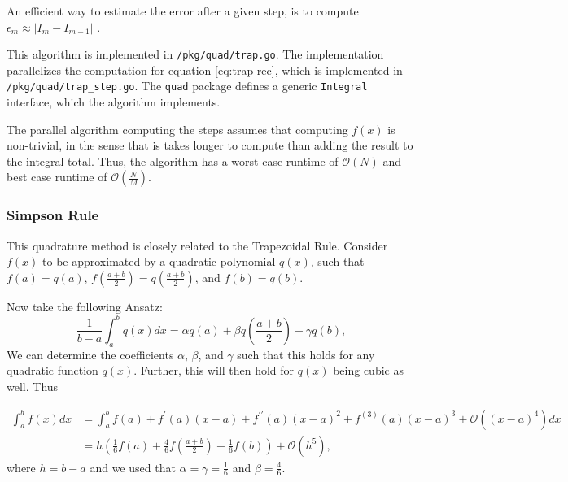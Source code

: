 \documentclass[10pt, a4paper]{article}
\begin{document}
  An efficient way to estimate the error after a given step, is to compute $\epsilon_m \approx |I_m - I_{m-1}|$
  \cite{nr}\footnotemark.


  This algorithm is implemented in \texttt{/pkg/quad/trap.go}. The implementation parallelizes the computation
  for equation \ref{eq:trap-rec}, which is implemented in \texttt{/pkg/quad/trap\_step.go}.
  The \texttt{quad} package defines a generic \texttt{Integral} interface, which the algorithm implements.

  The parallel algorithm computing the steps assumes that computing $f(x)$ is non-trivial, in the sense
  that is takes longer to compute than adding the result to the integral total. Thus, the
  algorithm has a worst case runtime of $\mathcal{O}(N)$ and best case runtime of $\mathcal{O}(\frac NM)$.

  \subsubsection{Simpson Rule}
  This quadrature method is closely related to the Trapezoidal Rule\footnotemark. Consider
  $f(x)$ to be approximated by a quadratic polynomial $q(x)$, such that $f(a) = q(a)$,
  $f(\frac{a+b}{2}) = q(\frac{a+b}{2})$, and $f(b) = q(b)$.


  Now take the following Ansatz:
  \begin{equation}
  \frac{1}{b-a} \int_a^b q(x) dx = \alpha q(a) + \beta q(\frac{a+b}{2}) + \gamma q(b),
  \end{equation}
  We can determine the coefficients $\alpha$, $\beta$, and $\gamma$ such that this holds for any
  quadratic function $q(x)$. Further, this will then hold for $q(x)$ being cubic as well\cite{nr}. Thus

  \begin{equation}
  \begin{split}
  \int_a^b f(x) dx &= \int_a^b f(a) + f^\prime(a) (x-a) + f^{\prime\prime}(a) (x-a)^2 + f^{(3)}(a) (x-a)^3 + \mathcal{O}\left((x-a)^4\right) dx \\
  &= h \left( \frac{1}{6} f(a) + \frac{4}{6} f(\frac{a+b}{2}) + \frac{1}{6} f(b) \right) + \mathcal{O}(h^5),
  \end{split}
  \end{equation}
  where $h = b-a$ and we used that $\alpha = \gamma = \frac{1}{6}$ and $\beta = \frac{4}{6}$.
\end{document}
